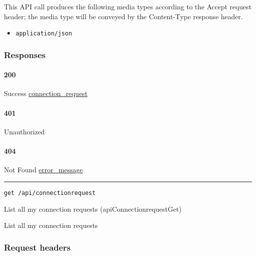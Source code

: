 This API call produces the following media types according to the
{Accept} request header; the media type will be conveyed by the
{Content-Type} response header.

\begin{itemize}
\tightlist
\item
  \texttt{application/json}
\end{itemize}

\hypertarget{responses-160}{%
\subsubsection{Responses}\label{responses-160}}

\hypertarget{section-515}{%
\paragraph{200}\label{section-515}}

Success \protect\hyperlink{connection_request}{connection\_request}

\hypertarget{section-516}{%
\paragraph{401}\label{section-516}}

Unauthorized \protect\hyperlink{}{}

\hypertarget{section-517}{%
\paragraph{404}\label{section-517}}

Not Found \protect\hyperlink{error_message}{error\_message}

\begin{center}\rule{0.5\linewidth}{\linethickness}\end{center}

\protect\hypertarget{apiConnectionrequestGet}{}{}

\begin{verbatim}
get /api/connectionrequest
\end{verbatim}

List all my connection requests ({apiConnectionrequestGet})

List all my connection requests

\hypertarget{request-headers-86}{%
\subsubsection{Request headers}\label{request-headers-86}}

